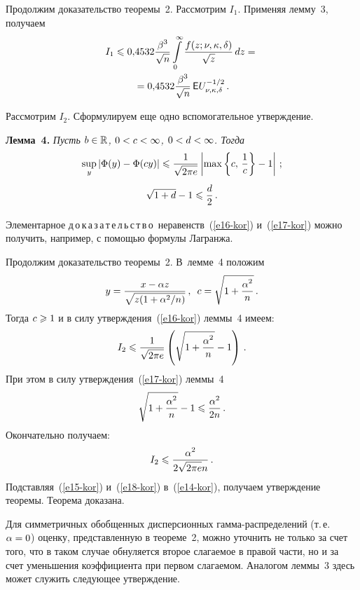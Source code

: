 \begin{multicols}{2}
\smallskip

Продолжим доказательство теоремы~2. Рас\-смот\-рим $I_1$. Применяя лемму~3, получаем
\begin{multline}
I_1\leqslant 0{,}4532\displaystyle\frac{\displaystyle \beta^3\mathstrut}{\displaystyle \sqrt{n}\mathstrut}\int\limits_{0}^{\infty}
\displaystyle\frac{\displaystyle f(z;\nu,\kappa,\delta)\mathstrut}{\displaystyle \sqrt{z}\mathstrut}\,dz={}\\
{}=0{,}4532\displaystyle\frac{\displaystyle \beta^3\mathstrut}{\displaystyle \sqrt{n}\mathstrut}\,{\sf E}U_{\nu,\kappa,\delta}^{-1/2}\,.\label{e15-kor}
\end{multline}

Рассмотрим $I_2$. Сформулируем еще одно вспомогательное утверждение.

\smallskip

\noindent
\textbf{Лемма~4.} \textit{Пусть $b\hm\in\r$, $0\hm<c\hm<\infty$, $0\hm<d\hm<\infty$.
Тогда}
\begin{equation}
\sup\limits_y|\Phi(y)-\Phi(cy)|\leqslant\displaystyle\frac{\displaystyle 1\mathstrut}{\displaystyle \sqrt{2\pi e}\mathstrut}
\left\vert\max\left\{c,\,\displaystyle\frac{\displaystyle 1\mathstrut}{\displaystyle c\mathstrut}\right\}-1\right\vert\,;\label{e16-kor}
\end{equation}
\begin{equation}
\sqrt{1+d}-1\leqslant\displaystyle\frac{\displaystyle d\mathstrut}{\displaystyle 2\mathstrut}\,.\label{e17-kor}
\end{equation}

\smallskip

\noindent
Элементарное д\,о\,к\,а\,з\,а\,т\,е\,л\,ь\,с\,т\,в\,о\ неравенств~(\ref{e16-kor}) и~(\ref{e17-kor})
можно получить, например, с помощью формулы Лагранжа.

\smallskip

Продолжим доказательство теоремы~2. В~лемме~4 положим
$$
y=\displaystyle\frac{\displaystyle x-\alpha z\mathstrut}{\displaystyle \sqrt{z(1+{\alpha^2}/{n})}\mathstrut}\,,\enskip
c=\sqrt{1+\displaystyle\frac{\displaystyle \alpha^2\mathstrut}{\displaystyle n\mathstrut}}\,.
$$
Тогда $c\hm\geqslant1$ и в силу утверждения~(\ref{e16-kor}) леммы~4 имеем:
$$
I_2\leqslant\displaystyle\frac{\displaystyle 1\mathstrut}{\displaystyle \sqrt{2\pi e}\mathstrut}\left(\sqrt{1+\displaystyle\frac{\displaystyle \alpha^2\mathstrut}{\displaystyle n\mathstrut}}-1\right)\,.
$$
При этом в силу утверждения~(\ref{e17-kor}) леммы~4
$$
\sqrt{1+\displaystyle\frac{\displaystyle \alpha^2\mathstrut}{\displaystyle n\mathstrut}}-1\leqslant\displaystyle\frac{\displaystyle \alpha^2\mathstrut}{\displaystyle 2n\mathstrut}\,.
$$
Окончательно получаем:
\begin{equation}
I_2\leqslant\displaystyle\frac{\displaystyle \alpha^2\mathstrut}{\displaystyle 2\sqrt{2\pi e}n\mathstrut}\,.\label{e18-kor}
\end{equation}
Подставляя~(\ref{e15-kor}) и~(\ref{e18-kor}) в~(\ref{e14-kor}), получаем утверждение теоремы. 
Теорема доказана.

\smallskip

Для симметричных обобщенных дисперсионных гам\-ма-рас\-пре\-де\-ле\-ний (т.\,е.\ 
$\alpha\hm=0$) оценку, представленную в теореме~2, можно уточнить
не только за счет того, что в таком случае обнуляется второе
слагаемое в правой части, но и за счет уменьшения коэффициента при
первом слагаемом. Аналогом леммы~3 здесь может служить следующее
утверждение.


\end{multicols}
